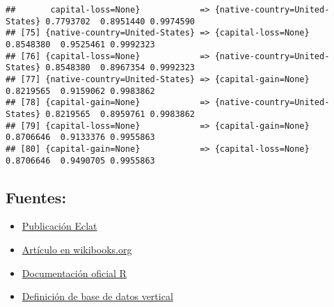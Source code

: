 \documentclass[]{article}
\providecommand{\tightlist}{%
  \setlength{\itemsep}{0pt}\setlength{\parskip}{0pt}}
\begin{document}
\begin{verbatim}
##       capital-loss=None}            => {native-country=United-States} 0.7793702  0.8951440 0.9974590
## [75] {native-country=United-States} => {capital-loss=None}            0.8548380  0.9525461 0.9992323
## [76] {capital-loss=None}            => {native-country=United-States} 0.8548380  0.8967354 0.9992323
## [77] {native-country=United-States} => {capital-gain=None}            0.8219565  0.9159062 0.9983862
## [78] {capital-gain=None}            => {native-country=United-States} 0.8219565  0.8959761 0.9983862
## [79] {capital-loss=None}            => {capital-gain=None}            0.8706646  0.9133376 0.9955863
## [80] {capital-gain=None}            => {capital-loss=None}            0.8706646  0.9490705 0.9955863
\end{verbatim}

\subsection{Fuentes:}\label{fuentes}

\begin{itemize}
\tightlist
\item
  \href{https://www.researchgate.net/publication/303523871_ECLAT_Algorithm_for_Frequent_Item_sets_Generation}{Publicación
  Eclat}
\item
  \href{https://en.wikibooks.org/wiki/Data_Mining_Algorithms_In_R/Frequent_Pattern_Mining/The_Eclat_Algorithm}{Artículo
  en wikibooks.org}
\item
  \href{https://www.rdocumentation.org/packages/arules/versions/1.6-1/topics/eclat}{Documentación
  oficial R}
\item
  \href{https://basededatosunounivia.wordpress.com/2015/03/14/que-es-una-base-de-datos-vertical/}{Definición
  de base de datos vertical}
\end{itemize}
\end{document}
